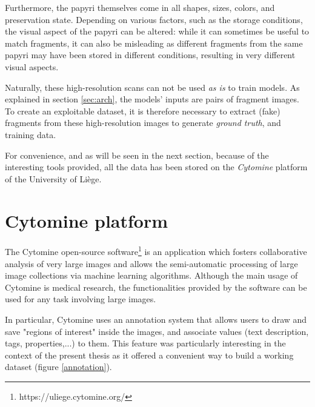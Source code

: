 \documentclass[11pt]{report}
\begin{document}
Furthermore, the papyri themselves come in all shapes, sizes, colors, and preservation state. Depending on various factors, such as the storage conditions, the visual aspect of the papyri can be altered: while it can sometimes be useful to match fragments, it can also be misleading as different fragments from the same papyri may have been stored in different conditions, resulting in very different visual aspects.\newline

Naturally, these high-resolution scans can not be used \emph{as is} to train models. As explained in section \ref{sec:arch}, the models' inputs are pairs of fragment images. To create an exploitable dataset, it is therefore necessary to extract  (fake) fragments from these high-resolution images to generate \emph{ground truth}, and training data.\newline

For convenience, and as will be seen in the next section, because of the interesting tools provided, all the data has been stored on the \emph{Cytomine} platform of the University of Liège.

\section{Cytomine platform}

The Cytomine open-source software\footnote{https://uliege.cytomine.org/} is an application which fosters collaborative analysis of very large images and allows the semi-automatic processing of large image collections via machine learning algorithms. Although the main usage of Cytomine is medical research, the functionalities provided by the software can be used for any task involving large images.\newline

In particular, Cytomine uses an annotation system that allows users to draw and save "regions of interest" inside the images, and associate values (text description, tags, properties,...) to them. This feature was particularly interesting in the context of the present thesis as it offered a convenient way to build a working dataset (figure \ref{annotation}).
\end{document}
